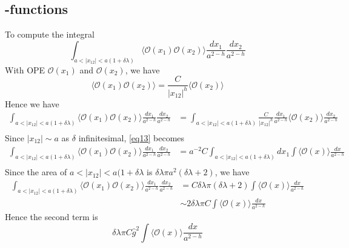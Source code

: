 \subsection{\beta-functions}
To compute the integral 
\[
\int_{a < |x_{12}| < a(1+\delta \lambda)} \langle \mathcal{O}(x_1) \mathcal{O}(x_2) \rangle \frac{d x_1}{a^{2-h}} \frac{d x_2}{a^{2-h}}
\]
With OPE $\mathcal{O}(x_1)$ and $\mathcal{O}(x_2)$, we have 
\begin{equation}
	\langle \mathcal{O}(x_1) \mathcal{O}(x_2) \rangle = \frac{C}{|x_{12}|^h} \langle\mathcal{O}(x_2)\rangle
\end{equation} 
Hence we have
\begin{equation}
\label{eq13}
	\begin{split}
	\int_{a < |x_{12} | < a(1+\delta\lambda)} \langle \mathcal{O}(x_1) \mathcal{O}(x_2) \rangle \frac{d x_1}{a^{2-h}} \frac{d x_2}{a^{2-h}} &= \int_{a < |x_{12} | < a(1+\delta\lambda)} \frac{C}{|x_{12}|^h} \frac{dx_1}{a^{2-h}} \langle \mathcal{O}(x_2) \rangle  \frac{dx_2}{a^{2-h}}\\
	&
	\end{split}
\end{equation}
Since $|x_{12}| \sim a$ as $\delta$ infinitesimal, \ref{eq13} becomes 
\begin{equation}
	\begin{split}
	\int_{a < |x_{12} | < a(1+\delta\lambda)} \langle \mathcal{O}(x_1) \mathcal{O}(x_2) \rangle \frac{d x_1}{a^{2-h}} \frac{d x_2}{a^{2-h}} & = a^{-2}C \int_{a < |x_{12} | < a(1+\delta\lambda)} dx_1 \int \langle \mathcal{O}(x) \rangle \frac{dx}{a^{2-h}}\\
	\end{split}
\end{equation}
Since the area of $a < |x_{12} | < a(1+\delta\lambda $ is $\delta \lambda \pi a^2 (\delta \lambda +2)$, we have
\begin{equation}
	\begin{split}
	\int_{a < |x_{12} | < a(1+\delta\lambda)} \langle \mathcal{O}(x_1) \mathcal{O}(x_2) \rangle \frac{d x_1}{a^{2-h}} \frac{d x_2}{a^{2-h}} & = C \delta \lambda \pi (\delta\lambda +2) \int \langle \mathcal{O}(x)\rangle \frac{dx}{a^{2-h}}\\
	& \sim 2 \delta \lambda \pi C \int \langle \mathcal{O}(x) \rangle \frac{dx}{a^{2-h}}
	\end{split}
\end{equation}
Hence the second term is 
\[
\delta \lambda \pi C \hat{g}^2  \int \langle \mathcal{O}(x) \rangle \frac{dx}{a^{2-h}}
\]
